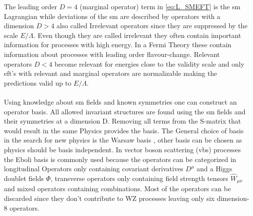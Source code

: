 \documentclass[../Bachelorarbeit.tex]{subfiles}
\begin{document}
The leading order $D = 4$ (marginal operator) term in \ref{eq:L_SMEFT} is the \acrshort{sm} Lagrangian while deviations of the \acrshort{sm} are described by operators with a dimension $D>4$ also called Irrelevant operators since they are suppressed by the scale $E/ \Lambda$.
Even though they are called irrelevant they often contain important information for processes with high energy. In a Fermi Theory these contain information about processes with leading order flavour-change.
Relevant operators $D<4$ become relevant for energies close to the validity scale and only \acrshort{eft}'s with relevant and marginal operators are normalizable making the predictions valid up to $E/\Lambda$.
\\\\
Using knowledge about \acrshort{sm} fields and known symmetries one can construct an operator basis. All allowed invariant structures are found using the \acrshort{sm} fields and their symmetries at a dimension D.
Removing all terms from the S-matrix that would result in the same Physics provides the basis. The General choice of basis in the search for new physics is the Warsaw basis \cite{Brivio.}, other basis can be chosen as physics should be basis independent.
In vector boson scattering (\acrshort{vbs}) processes the Eboli basis is commonly used because the operators can be categorized in longitudinal Operators only containing covariant derivatives $D^{\mu}$ and a Higgs doublet fields $\Phi$,
transverse operators only containing field strength tensors $\widehat{W}_{\mu\nu}$ and mixed operators containing combinations.
Most of the operators can be discarded since they don't contribute to WZ processes leaving only six dimension-8 operators.
\\
\end{document}
